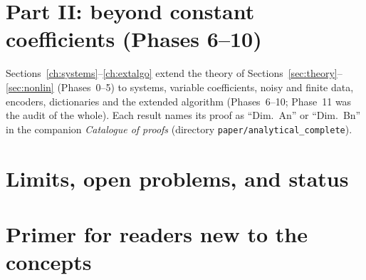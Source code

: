 \section*{Part II: beyond constant coefficients (Phases 6--10)}
\noindent Sections~\ref{ch:systems}--\ref{ch:extalgo} extend the theory of Sections~\ref{sec:theory}--\ref{sec:nonlin} (Phases~0--5) to systems, variable coefficients, noisy and
finite data, encoders, dictionaries and the extended algorithm (Phases~6--10; Phase~11 was the audit of the whole). Each result names its proof as ``Dim.~An'' or ``Dim.~Bn'' in the
companion \emph{Catalogue of proofs} (directory \texttt{paper/analytical\_complete}).








\section{Limits, open problems, and status}\label{sec:limits}






\appendix







\section{Primer for readers new to the concepts}\label{app:primer}




